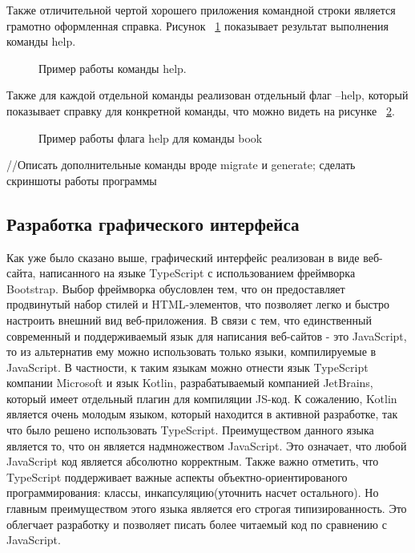 Также отличительной чертой хорошего приложения командной строки является грамотно оформленная справка.
Рисунок ~\ref{ris:help_example} показывает результат выполнения команды help. 

\begin{figure}[h!]
    \caption{Пример работы команды help.}
    \label{ris:help_example}
\end{figure}

Также для каждой отдельной команды реализован
отдельный флаг --help, который показывает справку для конкретной команды, что можно видеть на рисунке 
~\ref{ris:help_book_example}. 

\begin{figure}[h!]
\caption{Пример работы флага help для команды book}
\label{ris:help_book_example}
\end{figure}


//Описать дополнительные команды вроде migrate и generate; сделать скриншоты работы программы

\subsection*{Разработка графического интерфейса}

Как уже было сказано выше, графический интерфейс реализован в виде веб-сайта, написанного на языке TypeScript с 
использованием фреймворка Bootstrap.
Выбор фреймворка обусловлен тем, что он предоставляет продвинутый набор стилей и HTML-элементов, что позволяет 
легко и быстро настроить внешний вид веб-приложения.
В связи с тем, что единственный современный и поддерживаемый язык для написания веб-сайтов - это JavaScript, то 
из альтернатив ему можно использовать только языки, компилируемые в JavaScript. В частности, к таким языкам можно 
отнести язык TypeScript компании Microsoft и язык Kotlin, разрабатываемый компанией JetBrains, который имеет 
отдельный плагин для компиляции JS-код. К сожалению, Kotlin является очень молодым языком, который находится в 
активной разработке, так что было решено использовать TypeScript. Преимуществом данного языка является то, что 
он является надмножеством JavaScript. Это означает, что любой JavaScript код является абсолютно корректным. Также 
важно отметить, что TypeScript поддерживает важные аспекты объектно-ориентированого программирования: классы, 
инкапсуляцию(уточнить насчет остального). Но главным преимуществом этого языка является его строгая типизированность. 
Это облегчает разработку и позволяет писать более читаемый код по сравнению с JavaScript.


